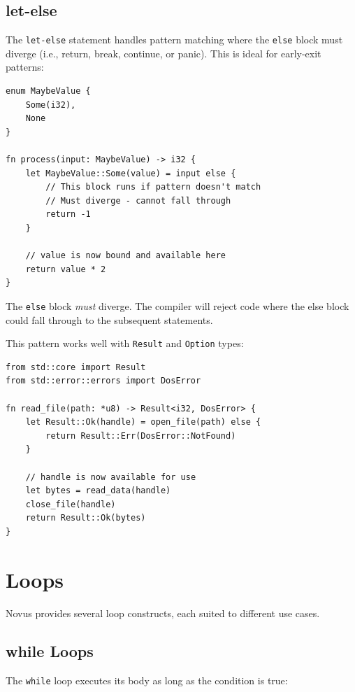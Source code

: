 \subsection{let-else}
\label{subsec:let-else}

The \texttt{let-else} statement handles pattern matching where the \texttt{else} block must diverge (i.e., return, break, continue, or panic). This is ideal for early-exit patterns:

\begin{lstlisting}
enum MaybeValue {
    Some(i32),
    None
}

fn process(input: MaybeValue) -> i32 {
    let MaybeValue::Some(value) = input else {
        // This block runs if pattern doesn't match
        // Must diverge - cannot fall through
        return -1
    }

    // value is now bound and available here
    return value * 2
}
\end{lstlisting}

The \texttt{else} block \emph{must} diverge. The compiler will reject code where the else block could fall through to the subsequent statements.

This pattern works well with \texttt{Result} and \texttt{Option} types:

\begin{lstlisting}
from std::core import Result
from std::error::errors import DosError

fn read_file(path: *u8) -> Result<i32, DosError> {
    let Result::Ok(handle) = open_file(path) else {
        return Result::Err(DosError::NotFound)
    }

    // handle is now available for use
    let bytes = read_data(handle)
    close_file(handle)
    return Result::Ok(bytes)
}
\end{lstlisting}

\section{Loops}
\label{sec:loops}

Novus provides several loop constructs, each suited to different use cases.

\subsection{while Loops}
\label{subsec:while}

The \texttt{while} loop executes its body as long as the condition is true:

